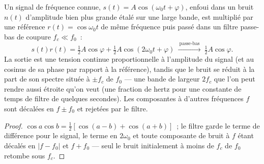 \begin{proposition}\label{prop:b2:feedback-oscillators:lockin}
Un signal de fréquence connue, $s(t) = A\cos(\omega_0t + \varphi)$, enfoui dans un
bruit $n(t)$ d'amplitude bien plus grande étalé sur une large bande, est
multiplié par une référence $r(t) = \cos\omega_0t$ de même fréquence
puis passé dans un filtre passe-bas de coupure $f_c \ll f_0$~:
\[
s(t)r(t) = \tfrac12A\cos\varphi + \tfrac12A\cos(2\omega_0t + \varphi)
\ \xrightarrow{\ \text{passe-bas}\ }\ \tfrac12A\cos\varphi .
\]
La sortie est une tension continue proportionnelle à l'amplitude du signal (et
au cosinus de sa phase par rapport à la référence), tandis que le bruit
se réduit à la part de son spectre située à $\pm f_c$ de $f_0$
--- une bande de largeur $2f_c$ que l'on peut rendre aussi étroite qu'on veut (une fraction
de hertz pour une constante de temps de filtre de quelques secondes). Les composantes à d'autres
fréquences $f$ sont décalées en $f \pm f_0$ et rejetées par le filtre.
\end{proposition}

\begin{proof}
$\cos a\cos b = \tfrac12[\cos(a - b) + \cos(a + b)]$~; le filtre garde le
terme de différence pour le signal, le terme en $2\omega_0$ et toute composante de bruit
à $f$ étant décalés en $|f - f_0|$ et $f + f_0$ --- seul le
bruit initialement à moins de $f_c$ de $f_0$ retombe sous $f_c$.
\end{proof}

